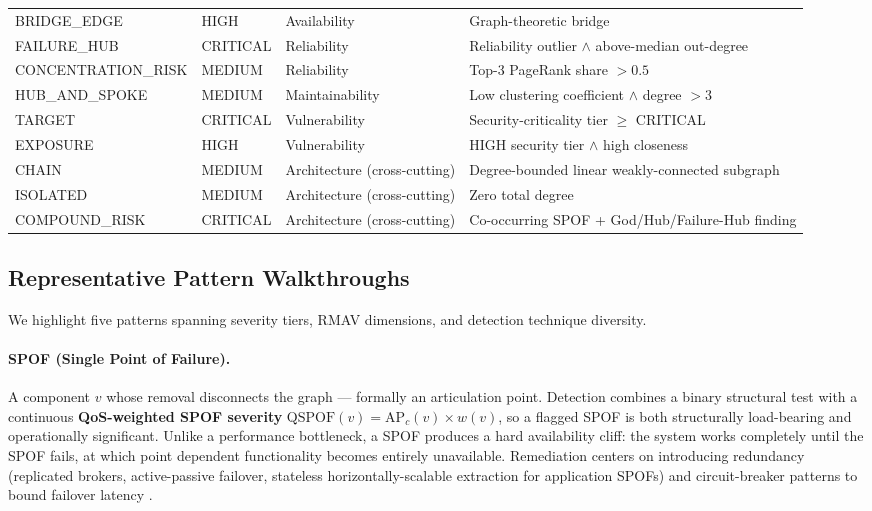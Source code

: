 \documentclass[11pt]{article}
\begin{document}
\begin{table}[htbp]
\begin{tabular}{@{}p{2.6cm}p{1.5cm}p{3.0cm}p{6.0cm}@{}}
BRIDGE\_EDGE & HIGH & Availability & Graph-theoretic bridge \\
FAILURE\_HUB & CRITICAL & Reliability & Reliability outlier $\wedge$ above-median out-degree \\
CONCENTRATION\_RISK & MEDIUM & Reliability & Top-3 PageRank share $> 0.5$ \\
HUB\_AND\_SPOKE & MEDIUM & Maintainability & Low clustering coefficient $\wedge$ degree $> 3$ \\
TARGET & CRITICAL & Vulnerability & Security-criticality tier $\ge$ CRITICAL \\
EXPOSURE & HIGH & Vulnerability & HIGH security tier $\wedge$ high closeness \\
CHAIN & MEDIUM & Architecture (cross-cutting) & Degree-bounded linear weakly-connected subgraph \\
ISOLATED & MEDIUM & Architecture (cross-cutting) & Zero total degree \\
COMPOUND\_RISK & CRITICAL & Architecture (cross-cutting) & Co-occurring SPOF + God/Hub/Failure-Hub finding \\
\bottomrule
\end{tabular}
\end{table}

\subsection{Representative Pattern Walkthroughs}

We highlight five patterns spanning severity tiers, RMAV dimensions, and detection technique
diversity.

\paragraph{SPOF (Single Point of Failure).} A component $v$ whose removal disconnects the graph ---
formally an articulation point. Detection combines a binary structural test with a continuous
\textbf{QoS-weighted SPOF severity} $\mathrm{QSPOF}(v) = \mathrm{AP}_c(v) \times w(v)$, so a flagged
SPOF is both structurally load-bearing and operationally significant. Unlike a performance bottleneck,
a SPOF produces a hard availability cliff: the system works completely until the SPOF fails, at which
point dependent functionality becomes entirely unavailable. Remediation centers on introducing
redundancy (replicated brokers, active-passive failover, stateless horizontally-scalable extraction for
application SPOFs) and circuit-breaker patterns to bound failover latency \cite{Nygard2018}.
\end{document}
